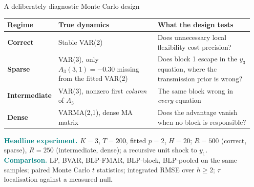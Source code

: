 \documentclass[aspectratio=169,11pt]{beamer}
\newcommand{\keypoint}[1]{\textcolor{Teal}{\textbf{#1}}}
\begin{document}
\begin{frame}{A deliberately diagnostic Monte Carlo design}
  \vspace{-1mm}
  {\fontsize{9}{10.6}\selectfont
  \renewcommand{\arraystretch}{1.0}
  \begin{tabularx}{\textwidth}{>{\bfseries}p{} p{} X}
    \toprule
    Regime & True dynamics & What the design tests \\
    \midrule
    Correct & Stable VAR(2) & Does unnecessary local flexibility cost precision? \\
    \rowcolor{PaleTeal}
    Sparse & VAR(3), only $A_3(3,1)=-0.30$ missing from the fitted VAR(2) & Does block 1 escape in the $y_3$ equation, where the transmission prior is wrong? \\
    Intermediate & VAR(3), nonzero first \emph{column} of $A_3$ & The same block wrong in \emph{every} equation \\
    Dense & VARMA(2,1), dense MA matrix & Does the advantage vanish when no block is responsible? \\
    \bottomrule
  \end{tabularx}}
  \vspace{1.5mm}
  {\fontsize{9.4}{11.2}\selectfont
  \keypoint{Headline experiment.} $K=3$, $T=200$, fitted $p=2$, $H=20$; $R=500$ (correct, sparse), $R=250$ (intermediate, dense); a recursive unit shock to $y_1$.
  \keypoint{Comparison.} LP, BVAR, BLP-FMAR, BLP-block, BLP-pooled on the same samples; paired Monte Carlo $t$ statistics; integrated RMSE over $h\geq2$; $\tau$ localisation against a measured null.}
\end{frame}
\end{document}
